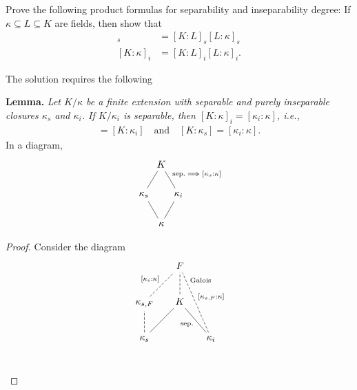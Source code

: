 \begin{probl}
    Prove the following product formulas for separability and inseparability degree: If\/ $\kappa\subseteq L\subseteq K$ are fields, then show that
    \begin{align*}
        [K : \kappa]_s &= [K : L]_s[L : \kappa]_s\\
        [K : \kappa]_i &= [K : L]_i[L : \kappa]_i.
    \end{align*}
\end{probl}

\begin{solution} The solution requires the following

    \textbf{Lemma.}
        \textit{Let\/ $K/\kappa$ be a finite extension with separable and purely inseparable closures\/ $\kappa_s$ and\/ $\kappa_i$. If\/ $K/\kappa_i$ is separable, then\/ $[K:\kappa]_i=[\kappa_i:\kappa]$, i.e.,}
        \begin{align*}
            [\kappa_s:k] = [K:\kappa_i]\quad\text{and}\quad
            [K:\kappa_s] = [\kappa_i:\kappa].
        \end{align*}
        In a diagram,
        \small
        $$
            \begin{tikzcd}[column sep=0cm]
                    &K\\
                \kappa_s
                        \arrow[ru,no head]
                    &&\kappa_i
                        \arrow[lu,"{\text{sep.}\implies[\kappa_s:\kappa]}"',no head]\\
                    &\kappa
                        \arrow[lu,no head]\arrow[ru,no head]
            \end{tikzcd}
        $$
        \normalsize
    \begin{proof} Consider the diagram
    \small
    $$
        \begin{tikzcd}[row sep=0.8cm, column sep=0.5cm]
                &F\\
            {\kappa_{s,F}}
                    \arrow[ru,"{[\kappa_i:\kappa]}",no head,dashed]
                &K
                    \arrow[u,no head,dashed]\\
            \kappa_s
                    \arrow[ru,no head]
                    \arrow[u,no head,dashed]
                &&\kappa_i
                    \arrow[lu,"\text{sep.}",no head]
                    \arrow[luu,"\text{\textcolor{black}{Galois}}"',no head,pos=0.8,color=white]
                    \arrow[luu,"{[\kappa_{s,F}:\kappa]}"',no head,dashed]\\

\end{tikzcd}$$
\end{proof}
\end{solution}
